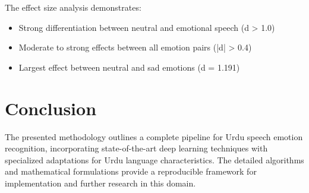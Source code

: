 \documentclass[12pt,a4paper]{article}
\begin{document}
The effect size analysis demonstrates:
\begin{itemize}
    \item Strong differentiation between neutral and emotional speech (d > 1.0)
    \item Moderate to strong effects between all emotion pairs (|d| > 0.4)
    \item Largest effect between neutral and sad emotions (d = 1.191)
\end{itemize}

\section{Conclusion}
The presented methodology outlines a complete pipeline for Urdu speech emotion recognition, incorporating state-of-the-art deep learning techniques with specialized adaptations for Urdu language characteristics. The detailed algorithms and mathematical formulations provide a reproducible framework for implementation and further research in this domain.

\printbibliography
\end{document}
